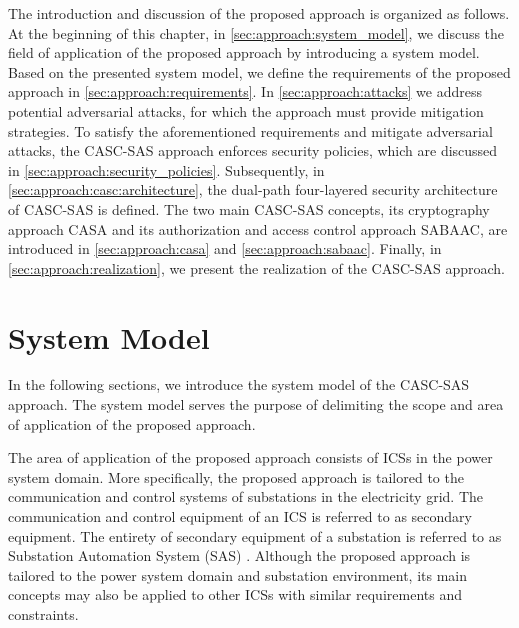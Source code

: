 The introduction and discussion of the proposed approach is organized as follows.
At the beginning of this chapter, in \autoref{sec:approach:system_model}, we discuss the field of application of the proposed approach by introducing a system model.
Based on the presented system model, we define the requirements of the proposed approach in \autoref{sec:approach:requirements}.
In \autoref{sec:approach:attacks} we address potential adversarial attacks, for which the approach must provide mitigation strategies.
To satisfy the aforementioned requirements and mitigate adversarial attacks, the CASC-SAS approach enforces security policies, which are discussed in \autoref{sec:approach:security_policies}.
Subsequently, in \autoref{sec:approach:casc:architecture}, the dual-path four-layered security architecture of CASC-SAS is defined.
The two main CASC-SAS concepts, its cryptography approach CASA and its authorization and access control approach SABAAC, are introduced in \autoref{sec:approach:casa} and \autoref{sec:approach:sabaac}.
Finally, in \autoref{sec:approach:realization}, we present the realization of the CASC-SAS approach.

\section{System Model}
\label{sec:approach:system_model}
In the following sections, we introduce the system model of the CASC-SAS approach.
The system model serves the purpose of delimiting the scope and area of application of the proposed approach.

The area of application of the proposed approach consists of ICSs in the power system domain.
More specifically, the proposed approach is tailored to the communication and control systems of substations in the electricity grid.
The communication and control equipment of an ICS is referred to as secondary equipment.
The entirety of secondary equipment of a substation is referred to as Substation Automation System (SAS) \cite{Padilla2015}.
Although the proposed approach is tailored to the power system domain and substation environment, its main concepts may also be applied to other ICSs with similar requirements and constraints.

